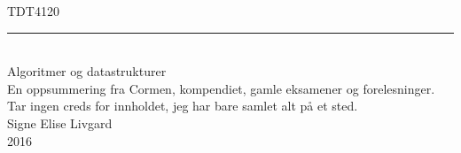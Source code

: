 \documentclass{article}
\begin{document}
\begin{center}
\vspace*{4.5cm}
\Huge{TDT4120}\\[2pc]
\vspace{-1.5cm}
\noindent\rule{11cm}{0.8pt}\\

\Huge{Algoritmer og datastrukturer}\\[1pc]
\vspace{3.5cm}
\large{En oppsummering fra Cormen, kompendiet, gamle eksamener og forelesninger. Tar ingen creds for innholdet, jeg har bare samlet alt på et sted.}\\
\vspace{1.5cm}
\Large{Signe Elise Livgard}\\
\Large{2016}\\
\end{center}

\setlength{\parindent}{3.5em}
\renewcommand{\baselinestretch}{1.1} %

\thispagestyle{empty}
\null
\newpage
\setcounter{page}{1}

\tableofcontents
\newpage

\setcounter{page}{1}


\newpage

\newpage

\newpage

\newpage

\newpage

\newpage

\newpage

\newpage

\newpage

\newpage

\newpage

\newpage

\end{document}
